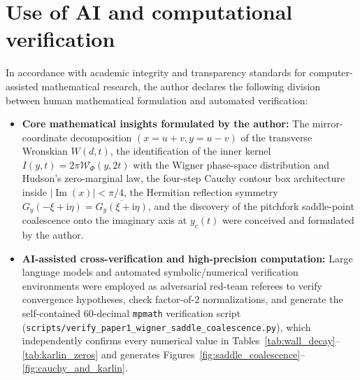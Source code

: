\documentclass[11pt,a4paper,reqno]{amsart}
\theoremstyle{definition}
\theoremstyle{remark}
\numberwithin{equation}{section}
\newcommand{\ii}{\mathrm{i}}
\newcommand{\Ima}{\operatorname{Im}}
\newcommand{\Wig}{\mathcal{W}}
\begin{document}
\section*{Use of AI and computational verification}

In accordance with academic integrity and transparency standards for computer-assisted mathematical research, the author declares the following division between human mathematical formulation and automated verification:
\begin{itemize}
\item \textbf{Core mathematical insights formulated by the author:} The mirror-coordinate decomposition $(x=u+v, y=u-v)$ of the transverse Wronskian $W(d,t)$, the identification of the inner kernel $I(y,t) = 2\pi\Wig_\Phi(y,2t)$ with the Wigner phase-space distribution and Hudson's zero-marginal law, the four-step Cauchy contour box architecture inside $|\Ima(x)| < \pi/4$, the Hermitian reflection symmetry $G_y(-\xi+\ii\eta) = \overline{G_y(\xi+\ii\eta)}$, and the discovery of the pitchfork saddle-point coalescence onto the imaginary axis at $y_c(t)$ were conceived and formulated by the author.
\item \textbf{AI-assisted cross-verification and high-precision computation:} Large language models and automated symbolic/numerical verification environments were employed as adversarial red-team referees to verify convergence hypotheses, check factor-of-$2$ normalizations, and generate the self-contained 60-decimal \texttt{mpmath} verification script (\nolinkurl{scripts/verify_paper1_wigner_saddle_coalescence.py}), which independently confirms every numerical value in Tables~\ref{tab:wall_decay}--\ref{tab:karlin_zeros} and generates Figures~\ref{fig:saddle_coalescence}--\ref{fig:cauchy_and_karlin}.
\end{itemize}
\end{document}
